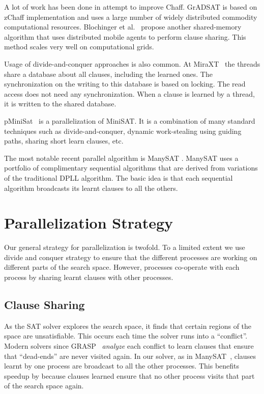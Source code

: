 \documentclass[letterpaper, compsoc, conference]{IEEEtran}
\begin{document}
\indent A lot of work has been done in attempt to improve Chaff. GrADSAT \cite{GRADSAT} is based on zChaff implementation and uses a large number of widely distributed commodity computational resources. Blochinger et al.~\cite{Blochinger} 
propose another shared-memory algorithm that uses distributed mobile agents to 
perform clause sharing. This method scales very well on computational grids.

\indent Usage of divide-and-conquer approaches is also common. At
 MiraXT~\cite{MiraXT} the threads share a database about all clauses, including the
learned ones. The synchronization on the writing to this database is based on
 locking. The read access does not need any synchronization. When a clause is learned 
by a thread, it is written to the shared database.

\indent pMiniSat~\cite{PMiniSat} is a parallelization of MiniSAT. It is a combination 
of many standard techniques such as divide-and-conquer, dynamic work-stealing using 
guiding paths, sharing short learn clauses, etc.

\indent The most notable recent parallel algorithm is ManySAT \citep{ManySAT}.
ManySAT uses a portfolio of complimentary sequential algorithms that are derived
from variations of the traditional DPLL algorithm. The basic idea is that each sequential algorithm broadcasts its learnt clauses to all the others.

\section{Parallelization Strategy}
\label{sec:strategy}

Our general strategy for parallelization is twofold. To a limited extent we use
divide and conquer strategy to ensure that the different processes are working
on different parts of the search space. However, processes co-operate with each
process by sharing learnt clauses with other processes. 

\subsection{Clause Sharing}

As the SAT solver explores the search space, it finds that certain regions of
the space are unsatisfiable. This occurs each time the solver runs into a
``conflict''. Modern solvers since GRASP~\cite{GRASP} \emph{analyze} each
conflict to learn clauses that ensure that ``dead-ends'' are never visited
again. In our solver, as in ManySAT~\cite{ManySAT}, clauses learnt by one
process are broadcast to all the other processes. This benefits speedup by
because clauses learned ensure that no other process visits that part 
of the search space again.
\end{document}
